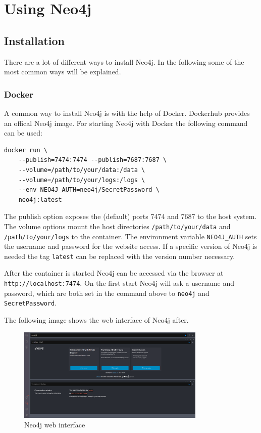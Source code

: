 \section{Using Neo4j}

\subsection{Installation}
There are a lot of different ways to install Neo4j. In the following some of the
most common ways will be explained.

\subsubsection{Docker}
A common way to install Neo4j is with the help of Docker. Dockerhub provides an
offical Neo4j image. For starting Neo4j with Docker the following command can be
used:
\begin{lstlisting}
docker run \
    --publish=7474:7474 --publish=7687:7687 \
    --volume=/path/to/your/data:/data \
    --volume=/path/to/your/logs:/logs \ 
    --env NEO4J_AUTH=neo4j/SecretPassword \
    neo4j:latest
\end{lstlisting}
The publish option exposes the (default) ports 7474 and 7687 to the host system.
The volume options mount the host directories \texttt{/path/to/your/data} and
\texttt{/path/to/your/logs} to the container. The environment variable
\texttt{NEO4J\_AUTH} sets the username and password for the website access. If a
specific version of Neo4j is needed the tag \texttt{latest} can be replaced with
the version number necessary.

After the container is started Neo4j can be accessed via the browser at
\texttt{http://localhost:7474}. On the first start Neo4j will ask a username and
password, which are both set in the command above to \texttt{neo4j} and
\texttt{SecretPassword}.

The following image shows the web interface of Neo4j after.
\begin{figure}[ht]
    \centering
    \includegraphics[width=0.8\textwidth]{images/neo4j-web-interface.png}
    \caption{Neo4j web interface}
    \label{fig:neo4j-web-interface}
\end{figure}

